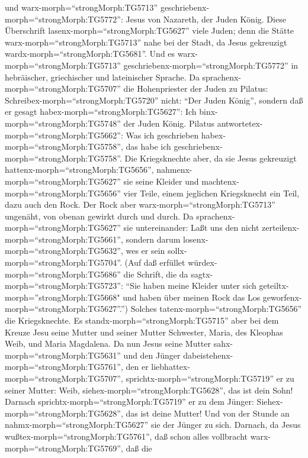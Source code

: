und warx-morph=``strongMorph:TG5713''
geschriebenx-morph=``strongMorph:TG5772'': Jesus von Nazareth, der Juden
König.  Diese Überschrift
lasenx-morph=``strongMorph:TG5627'' viele Juden; denn die Stätte
warx-morph=``strongMorph:TG5713'' nahe bei der Stadt, da Jesus
gekreuzigt wardx-morph=``strongMorph:TG5681''. Und es
warx-morph=``strongMorph:TG5713''
geschriebenx-morph=``strongMorph:TG5772'' in hebräischer, griechischer
und lateinischer Sprache.  Da
sprachenx-morph=``strongMorph:TG5707'' die Hohenpriester der Juden zu
Pilatus: Schreibex-morph=``strongMorph:TG5720'' nicht: ``Der Juden
König'', sondern daß er gesagt habex-morph=``strongMorph:TG5627'': Ich
binx-morph=``strongMorph:TG5748'' der Juden König.  Pilatus
antwortetex-morph=``strongMorph:TG5662'': Was ich geschrieben
habex-morph=``strongMorph:TG5758'', das habe ich
geschriebenx-morph=``strongMorph:TG5758''.  Die
Kriegsknechte aber, da sie Jesus gekreuzigt
hattenx-morph=``strongMorph:TG5656'',
nahmenx-morph=``strongMorph:TG5627'' sie seine Kleider und
machtenx-morph=``strongMorph:TG5656'' vier Teile, einem jeglichen
Kriegsknecht ein Teil, dazu auch den Rock. Der Rock aber
warx-morph=``strongMorph:TG5713'' ungenäht, von obenan gewirkt durch und
durch.  Da sprachenx-morph=``strongMorph:TG5627'' sie
untereinander: Laßt uns den nicht
zerteilenx-morph=``strongMorph:TG5661'', sondern darum
losenx-morph=``strongMorph:TG5632'', wes er sein
sollx-morph=``strongMorph:TG5704''. (Auf daß erfüllet
würdex-morph=``strongMorph:TG5686'' die Schrift, die da
sagtx-morph=``strongMorph:TG5723'': ``Sie haben meine Kleider unter sich
geteiltx-morph=''strongMorph:TG5668" und haben über meinen Rock das Los
geworfenx-morph=``strongMorph:TG5627''.'') Solches
tatenx-morph=``strongMorph:TG5656'' die Kriegsknechte.  Es
standx-morph=``strongMorph:TG5715'' aber bei dem Kreuze Jesu seine
Mutter und seiner Mutter Schwester, Maria, des Kleophas Weib, und Maria
Magdalena.  Da nun Jesus seine Mutter
sahx-morph=``strongMorph:TG5631'' und den Jünger
dabeistehenx-morph=``strongMorph:TG5761'', den er
liebhattex-morph=``strongMorph:TG5707'',
sprichtx-morph=``strongMorph:TG5719'' er zu seiner Mutter: Weib,
siehex-morph=``strongMorph:TG5628'', das ist dein Sohn! 
Darnach sprichtx-morph=``strongMorph:TG5719'' er zu dem Jünger:
Siehex-morph=``strongMorph:TG5628'', das ist deine Mutter! Und von der
Stunde an nahmx-morph=``strongMorph:TG5627'' sie der Jünger zu sich.
 Darnach, da Jesus wußtex-morph=``strongMorph:TG5761'', daß
schon alles vollbracht warx-morph=``strongMorph:TG5769'', daß die
